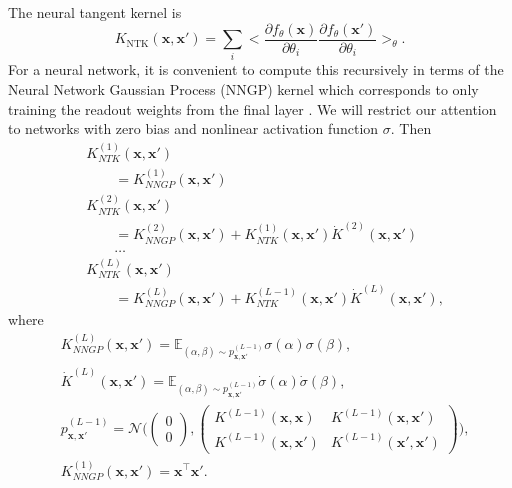 \documentclass{article}
\begin{document}
The neural tangent kernel is
\begin{equation}
    K_{\text{NTK}}(\mathbf{x},\mathbf{x}') = \sum_{i} \Big< \frac{\partial f_\theta(\mathbf{x})}{\partial \theta_i} \frac{\partial f_\theta(\mathbf{x}')}{\partial \theta_i} \Big>_{\theta}.
\end{equation}
%
For a neural network, it is convenient to compute this recursively in terms of the Neural Network Gaussian Process (NNGP) kernel which corresponds to only training the readout weights from the final layer \cite{jacot2018neural, arora2019exact}. We will restrict our attention to networks with zero bias and nonlinear activation function $\sigma$. Then
\begin{align}\label{eq.NTKRecursion}
&K_{NTK}^{(1)}(\mathbf{x},\mathbf{x}')\nonumber \\
&\qquad=K_{NNGP}^{(1)}(\mathbf{x},\mathbf{x}') \nonumber\\
&K_{NTK}^{(2)}(\mathbf{x},\mathbf{x}')\nonumber\\&\qquad=K_{NNGP}^{(2)}(\mathbf{x},\mathbf{x}')+K_{NTK}^{(1)}(\mathbf{x},\mathbf{x}')\dot{K}^{(2)}(\mathbf{x},\mathbf{x}') \nonumber\\ &\qquad \ldots \nonumber\\
&K_{NTK}^{(L)}(\mathbf{x},\mathbf{x}') \nonumber\\ &\qquad=  K_{NNGP}^{(L)}(\mathbf{x},\mathbf{x}')+ K_{NTK}^{(L-1)}(\mathbf{x},\mathbf{x}')\dot{K}^{(L)}(\mathbf{x},\mathbf{x}'),
\end{align}
%
where 
\begin{align}
\nonumber
    &K_{NNGP}^{(L)}(\mathbf{x},\mathbf{x}') = \mathbb{E}_{(\alpha,\beta) \sim p^{(L-1)}_{\mathbf{x},\mathbf{x'}} } \sigma(\alpha) \sigma(\beta),
    \\
    \nonumber
    &\dot{K}^{(L)}(\mathbf{x},\mathbf{x}') = \mathbb{E}_{(\alpha,\beta) \sim p^{(L-1)}_{\mathbf{x},\mathbf{x'}} } \dot{\sigma}(\alpha) \dot{\sigma}(\beta),
    \\
    \nonumber
    &p^{(L-1)}_{\mathbf{x},\mathbf{x'}} = \mathcal{N}\Bigg(
    \begin{pmatrix}
    0
    \\
    0
    \end{pmatrix}
    , \begin{pmatrix} K^{(L-1)}(\mathbf{x},\mathbf{x}) & K^{(L-1)}(\mathbf{x},\mathbf{x}')
    \\
    K^{(L-1)}(\mathbf{x},\mathbf{x}') & K^{(L-1)}(\mathbf{x}',\mathbf{x}')
    \end{pmatrix}
     \Bigg),
    \\
    &K^{(1)}_{NNGP}(\mathbf{x},\mathbf{x}') = \mathbf{x}^\top \mathbf{x}'.
\end{align}
\end{document}
